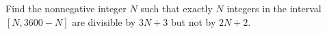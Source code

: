 Find the nonnegative integer $N$ such that exactly $N$ integers in the interval $[N,3600-N]$ are divisible by $3N+3$ but not by $2N+2$.
